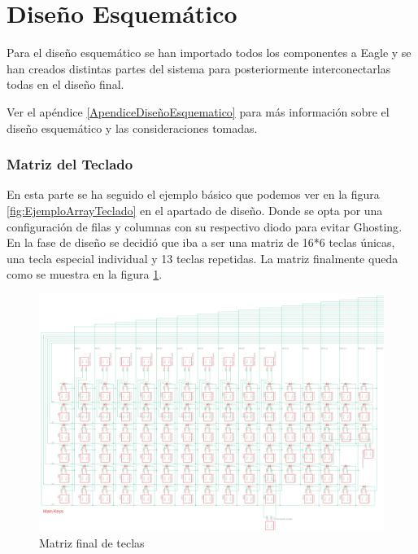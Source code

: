 \newpage
\section{Diseño Esquemático}
Para el diseño esquemático se han importado todos los componentes a Eagle y se han creados distintas partes del sistema para posteriormente interconectarlas todas en el diseño final.

\begin{tcolorbox}[colback=blue!5!white, colframe=blue!55!white, title=Nota]
    Ver el apéndice \ref{ApendiceDiseñoEsquematico} para más información sobre el diseño esquemático y las consideraciones tomadas. 
\end{tcolorbox}

\subsubsection{Matriz del Teclado}
En esta parte se ha seguido el ejemplo básico que podemos ver en la figura \ref{fig:EjemploArrayTeclado} en el apartado de diseño. Donde se opta por una configuración de filas y columnas con su respectivo diodo para evitar \gls{Ghosting}. En la fase de diseño se decidió que iba a ser una matriz de 16*6 teclas únicas, una tecla especial individual y 13 teclas repetidas. La matriz finalmente queda como se muestra en la figura \ref{fig:MatrizTeclas}.

\begin{figure}[H]
    \centering
    \includegraphics[width=1.0\textwidth]{imagenes/Capitulos/Cap04/MatrizTeclas.png}
    \caption{Matriz final de teclas \cite{Repo:ImagenCircuito}}
    \label{fig:MatrizTeclas}
\end{figure}

